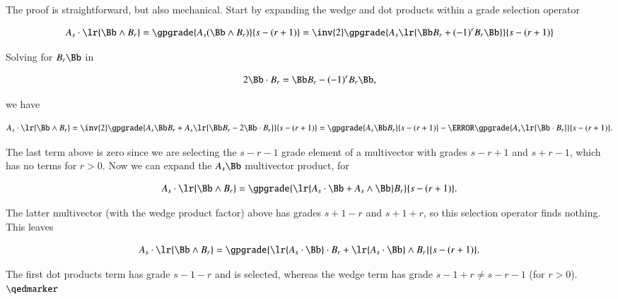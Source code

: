 %
%
The proof is straightforward, but also mechanical.
Start by expanding the wedge and dot products within a grade selection operator

\begin{dmath}\label{eqn:stokesTheoremGeometricAlgebra:1460}
A_s \cdot \lr{ \Bb \wedge B_r }
=
\gpgrade{A_s (\Bb \wedge B_r)}{s - (r + 1)}
=
\inv{2} \gpgrade{A_s \lr{\Bb B_r + (-1)^{r} B_r \Bb} }{s - (r + 1)}
\end{dmath}

Solving for \(B_r \Bb\) in

\begin{dmath}\label{eqn:stokesTheoremGeometricAlgebra:1480}
2 \Bb \cdot B_r = \Bb B_r - (-1)^{r} B_r \Bb,
\end{dmath}

we have

\begin{dmath}\label{eqn:stokesTheoremGeometricAlgebra:1500}
A_s \cdot \lr{ \Bb \wedge B_r }
=
\inv{2} \gpgrade{ A_s \Bb B_r + A_s \lr{ \Bb B_r - 2 \Bb \cdot B_r } }{s - (r + 1)}
=
\gpgrade{ A_s \Bb B_r }{s - (r + 1)}
-
\cancel{\gpgrade{ A_s \lr{ \Bb \cdot B_r } }{s - (r + 1)}}.
\end{dmath}

The last term above is zero since we are selecting the \(s - r - 1\) grade element of a multivector with grades \(s - r + 1\) and \(s + r - 1\), which has no terms for \(r > 0\).
Now we can expand the \(A_s \Bb\) multivector product, for

\begin{dmath}\label{eqn:stokesTheoremGeometricAlgebra:1520}
A_s \cdot \lr{ \Bb \wedge B_r }
=
\gpgrade{ \lr{ A_s \cdot \Bb + A_s \wedge \Bb} B_r }{s - (r + 1)}.
\end{dmath}

The latter multivector (with the wedge product factor) above has grades \(s + 1 - r\) and \(s + 1 + r\), so this selection operator finds nothing.
This leaves

\begin{dmath}\label{eqn:stokesTheoremGeometricAlgebra:1540}
A_s \cdot \lr{ \Bb \wedge B_r }
=
\gpgrade{
\lr{ A_s \cdot \Bb } \cdot B_r
+ \lr{ A_s \cdot \Bb } \wedge B_r
}{s - (r + 1)}.
\end{dmath}

The first dot products term has grade \(s - 1 - r\) and is selected, whereas the wedge term has grade \(s - 1 + r \ne s - r - 1\) (for \(r > 0\)).  \(\qedmarker\)

